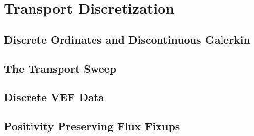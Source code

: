\documentclass[../doc.tex]{subfiles}
\begin{document}
\chapter{Transport Discretization}

\section{Discrete Ordinates and Discontinuous Galerkin}

\section{The Transport Sweep}

\section{Discrete VEF Data}

\section{Positivity Preserving Flux Fixups}
\end{document}

